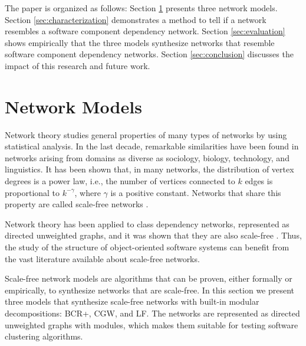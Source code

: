 The paper is organized as follows: Section \ref{sec:models} presents three
network models.
%
Section \ref{sec:characterization} demonstrates a method to tell if a network
resembles a software component dependency network.
%
Section \ref{sec:evaluation} shows empirically that the three models synthesize
networks that resemble software component dependency networks.
%
Section \ref{sec:conclusion} discusses the impact of this research and future
work.


\section{Network Models} \label{sec:models} 

Network theory studies general properties of many types of networks by using
statistical analysis. In the last decade, remarkable similarities have been
found in networks arising from domains as diverse as sociology, biology,
technology, and linguistics. It has been shown that, in many networks, the
distribution of vertex degrees is a power law, i.e., the number of vertices
connected to $k$ edges is proportional to $k^{-\gamma}$, where $\gamma$ is a
positive constant. Networks that share this property are called scale-free
networks \cite{Barabasi1999}.

Network theory has been applied to class dependency networks, represented as
directed unweighted graphs, and it was shown that they are also scale-free
\cite{Myers2003,Valverde2002}. Thus, the study of the structure of
object-oriented software systems can benefit from the vast literature available
about scale-free networks. 

Scale-free network models are algorithms that can be proven, either formally or
empirically, to synthesize networks that are scale-free. In this section we
present three models that synthesize scale-free networks with built-in modular
decompositions: BCR+, CGW, and LF. The networks are represented as directed
unweighted graphs with modules, which makes them suitable for testing software
clustering algorithms.



